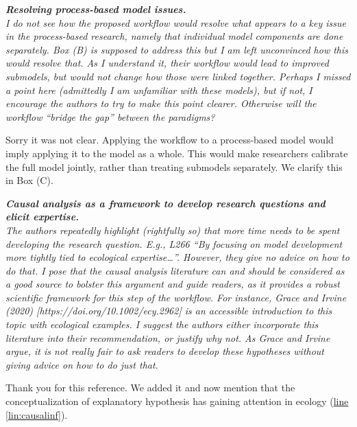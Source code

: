 \documentclass[11pt,letter]{article}
\begin{document}
\begin{mybox}
\emph{\textbf{Resolving process-based model issues.}\\
I do not see how the proposed workflow would resolve what appears to a key issue in the process-based research, namely that individual model components are done separately. Box (B) is supposed to address this but I am left unconvinced how this would resolve that. As I understand it, their workflow would lead to improved submodels, but would not change how those were linked together. Perhaps I missed a point here (admittedly I am unfamiliar with these models), but if not, I encourage the authors to try to make this point clearer. Otherwise will the workflow “bridge the gap” between the paradigms?}
\end{mybox}

Sorry it was not clear. Applying the workflow to a process-based model would imply applying it to the model as a whole. This would make researchers calibrate the full model jointly, rather than treating submodels separately. We clarify this in Box (C).

\begin{mybox}
\emph{\textbf{Causal analysis as a framework to develop research questions and elicit expertise.}\\
The authors repeatedly highlight (rightfully so) that more time needs to be spent developing the research question. E.g., L266 “By focusing on model development more tightly tied to ecological expertise…”. However, they give no advice on how to do that. I pose that the causal analysis literature can and should be considered as a good source to bolster this argument and guide readers, as it provides a robust scientific framework for this step of the workflow. For instance, Grace and Irvine (2020) [https://doi.org/10.1002/ecy.2962] is an accessible introduction to this topic with ecological examples. I suggest the authors either incorporate this literature into their recommendation, or justify why not. As Grace and Irvine argue, it is not really fair to ask readers to develop these hypotheses without giving advice on how to do just that.}
\end{mybox}

Thank you for this reference. We added it and now mention that the conceptualization of explanatory hypothesis has gaining attention in ecology (\href{file:forecastflows_r1\#lintarget:causalinf}{line \ref*{lin:causalinf}}).
\end{document}
